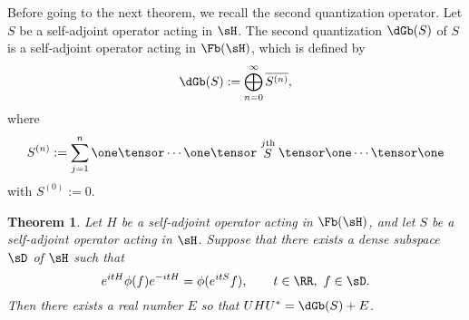 \documentclass[12pt]{article}
\theoremstyle{plain}
\newtheorem{theorem}{Theorem}[section]
\numberwithin{equation}{section}
\theoremstyle{remark}
\begin{document}
Before going to the next theorem, we recall the second quantization operator.
Let $S$ be a self-adjoint operator acting in $\sH$.
The second quantization $\dGb(S)$ of $S$ is a self-adjoint operator acting in $\Fb(\sH)$, which is defined by
\begin{align*}
  \dGb(S) := \bigoplus_{n=0}^\infty \overline{S^{(n)}},
\end{align*}
where 
\begin{equation}\label{S(n)}
S^{(n)}:= {\sum_{j=1}^{n} \one\tensor\cdots \one\tensor
\stackrel{j\mathrm{th}}{S}\tensor \one\cdots \tensor \one}
\end{equation}
with
$S^{(0)}:=0$.

\begin{theorem}\label{diagonalization}
Let $H$ be a self-adjoint operator acting in $\Fb(\sH)$, and let $S$ be a self-adjoint operator acting in $\sH$.
Suppose that there exists a dense subspace $\sD$ of $\sH$ such that
\begin{equation}\label{covariance}
 e^{itH}\phi(f)e^{-itH}=\phi(e^{itS}f), \qquad  t\in \RR,\ f\in\sD.
\end{equation}
Then there exists a real number $E$ so that $UHU^*=\dGb(S)+E$. 
\end{theorem}
\end{document}

